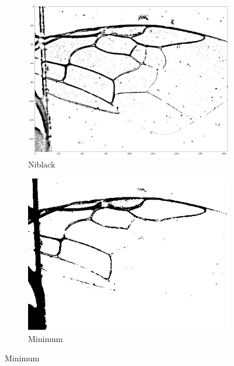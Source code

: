 \documentclass[a4paper]{article}
\begin{document}
\begin{figure}[H]
\begin{subfigure}{.35\textwidth}
  \centering
  \includegraphics[width=\linewidth]{figures/niblack.png}
  \caption{Niblack}
\end{subfigure}
\begin{subfigure}{.35\textwidth}
  \centering
  \includegraphics[width=\linewidth]{figures/minimum.png}
  \caption{Minimum}
\end{subfigure}


\end{figure}
\end{document}
